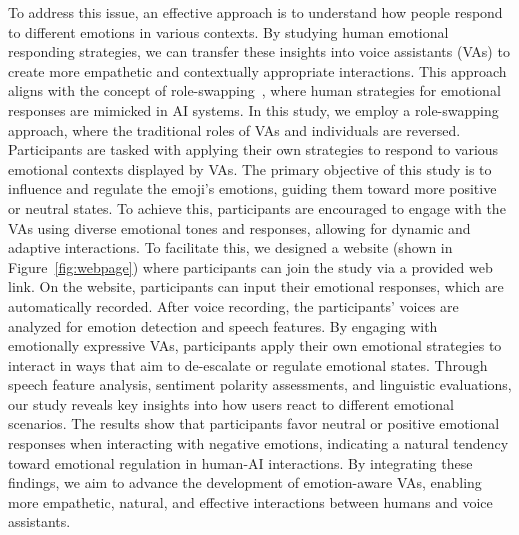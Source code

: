 To address this issue, an effective approach is to understand how people respond to different emotions in various contexts. By studying human emotional responding strategies, we can transfer these insights into voice assistants (VAs) to create more empathetic and contextually appropriate interactions. This approach aligns with the concept of role-swapping~\cite{ma2022should,huang2024relationship}, where human strategies for emotional responses are mimicked in AI systems.
In this study, we employ a role-swapping approach, where the traditional roles of VAs and individuals are reversed. Participants are tasked with applying their own strategies to respond to various emotional contexts displayed by VAs. The primary objective of this study is to influence and regulate the emoji's emotions, guiding them toward more positive or neutral states. To achieve this, participants are encouraged to engage with the VAs using diverse emotional tones and responses, allowing for dynamic and adaptive interactions.
To facilitate this, we designed a website (shown in Figure~\ref{fig:webpage}) where participants can join the study via a provided web link. On the website, participants can input their emotional responses, which are automatically recorded. After voice recording, the participants' voices are analyzed for emotion detection and speech features.
By engaging with emotionally expressive VAs, participants apply their own emotional strategies to interact in ways that aim to de-escalate or regulate emotional states. Through speech feature analysis, sentiment polarity assessments, and linguistic evaluations, our study reveals key insights into how users react to different emotional scenarios. The results show that participants favor neutral or positive emotional responses when interacting with negative emotions, indicating a natural tendency toward emotional regulation in human-AI interactions. By integrating these findings, we aim to advance the development of emotion-aware VAs, enabling more empathetic, natural, and effective interactions between humans and voice assistants.

